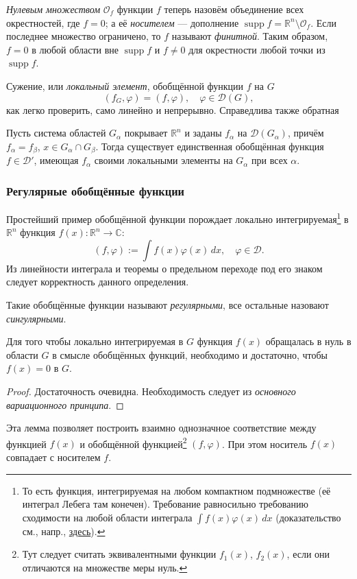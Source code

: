 \emph{Нулевым множеством} $ \mathcal O_f $ функции $ f $ теперь назовём объединение всех окрестностей, где $ f
= 0$; а её \emph{носителем} --- дополнение $ \operatorname{supp} f = \mathbb R^n
\setminus\mathcal O_f$. Если последнее множество ограничено, то $ f $ называют
\emph{финитной}. Таким образом, $ f = 0 $ в любой области вне $ \operatorname{supp} f $
и $ f\neq 0 $ для окрестности любой точки из $ \operatorname{supp}f $.

Сужение, или \emph{локальный элемент}, обобщённой функции $ f $ на $ G $  
\[
(f_G, \varphi) = (f, \varphi), \quad \varphi \in\mathcal D(G),
\]
как легко проверить, само линейно и непрерывно. Справедлива также обратная
\begin{theorem}
	Пусть система областей $ G_\alpha $ покрывает $ \mathbb R^n $ и заданы $
	f_\alpha $ на $ \mathcal D(G_\alpha) $, причём $ f_\alpha = f_\beta $, $ x \in
	G_\alpha \cap G_\beta$. Тогда существует единственная обобщённая функция $ f
	\in\mathcal D' $, имеющая $ f_\alpha $ своими локальными элементы на $
	G_\alpha $ при всех $ \alpha $.
\end{theorem}

\subsubsection{Регулярные обобщённые функции}
Простейший пример обобщённой функции порождает локально
интегрируемая\footnote{То есть функция, интегрируемая на
	любом компактном подмножестве (её интеграл Лебега там конечен). Требование
	равносильно требованию сходимости на любой области интеграла $ \int f(x)\varphi(x)\,dx $
	(доказательство см., напр.,
	\href{https://en.wikipedia.org/wiki/Locally_integrable_function}{здесь}).} в $ \mathbb R^n
$ функция $ f(x)\colon \mathbb R^n \to \mathbb C $: 
\[
(f,\varphi) := \int f(x)\varphi(x)\,dx, \quad \varphi \in \mathcal D.
\]
Из линейности интеграла и теоремы о предельном переходе под его знаком следует
корректность данного определения.

Такие обобщённые функции называют \emph{регулярными}, все остальные назовают
\emph{сингулярными}.

\begin{theorem}
	Для того чтобы локально интегрируемая в $ G $ функция $ f(x) $ обращалась в
	нуль в области $ G $ в смысле обобщённых функций, необходимо и достаточно,
	чтобы $ f(x) = 0 $ в $ G $.
\end{theorem}
\begin{proof} Достаточность очевидна. Необходимость следует из \emph{основного
		вариационного принципа}.
\end{proof}
Эта лемма позволяет построить взаимно однозначное соответствие между функцией $
f(x)$ и обобщённой функцией\footnote{Тут следует считать эквивалентными функции
	$ f_1(x) $, $ f_2(x) $, если они отличаются на множестве меры нуль.} $ (f, \varphi) $. При этом носитель $ f(x) $
совпадает с носителем $ f $.

